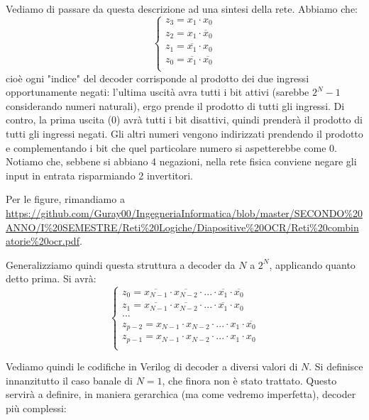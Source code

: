 \documentclass[a4paper,11pt]{article}
\begin{document}
Vediamo di passare da questa descrizione ad una sintesi della rete. Abbiamo che:
\[
	\begin{cases}
			
z_3 = x_1 \cdot x_0 \\ 
z_2 = x_1 \cdot \overline{x}_0 \\ 
z_1 = \overline{x_1} \cdot x_0 \\ 
z_0 = \overline{x_1} \cdot \overline{x_0} \\ 
	\end{cases}
\]
cioè ogni "indice" del decoder corrisponde al prodotto dei due ingressi opportunamente negati: l'ultima uscità avra tutti i bit attivi (sarebbe $2^N -1$ considerando numeri naturali), ergo prende il prodotto di tutti gli ingressi.
Di contro, la prima uscita ($0$) avrà tutti i bit disattivi, quindi prenderà il prodotto di tutti gli ingressi negati.
Gli altri numeri vengono indirizzati prendendo il prodotto e complementando i bit che quel particolare numero si aspetterebbe come $0$.
Notiamo che, sebbene si abbiano 4 negazioni, nella rete fisica conviene negare gli input in entrata risparmiando 2 invertitori.

Per le figure, rimandiamo a \url{https://github.com/Guray00/IngegneriaInformatica/blob/master/SECONDO%20ANNO/I%20SEMESTRE/Reti%20Logiche/Diapositive%20OCR/Reti%20combinatorie%20ocr.pdf}.

Generalizziamo quindi questa struttura a decoder da $N$ a $2^N$, applicando quanto detto prima. Si avrà:
\[
	\begin{cases}
		z_0 = \overline{x_{N-1}} \cdot \overline{x_{N-2}} \cdot ... \cdot \overline{x_1} \cdot \overline{x_0}	\\
		z_1 = \overline{x_{N-1}} \cdot \overline{x_{N-2}} \cdot ... \cdot \overline{x_1} \cdot x_0	\\
		... \\ 
		z_{p-2} = x_{N-1} \cdot x_{N-2} \cdot ... \cdot x_1 \cdot \overline{x_0} \\
		z_{p-1} = x_{N-1} \cdot x_{N-2} \cdot ... \cdot x_1 \cdot x_0	\\
	\end{cases}
\]

Vediamo quindi le codifiche in Verilog di decoder a diversi valori di $N$.
Si definisce innanzitutto il caso banale di $N = 1$, che finora non è stato trattato.
Questo servirà a definire, in maniera gerarchica (ma come vedremo imperfetta), decoder più complessi:


\end{document}
